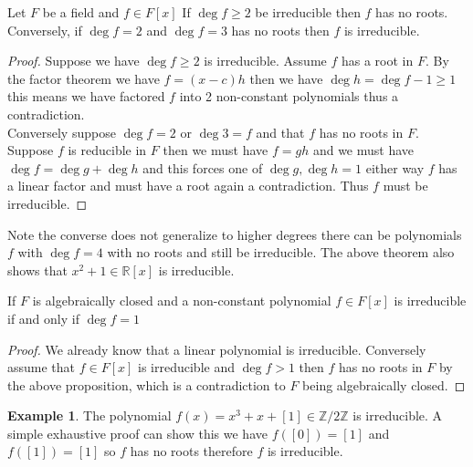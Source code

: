 \documentclass[16pt,a4paper]{article}
\theoremstyle{definition}
\newtheorem{example}{Example}
\newcommand{\Z}{\mathbb{Z}}
\newcommand{\R}{\mathbb{R}}
\begin{document}
\begin{prop}{}{}
  Let $F$ be a field and $f\in F[x]$ If $\deg f \geq 2$ be irreducible then $f$ has no roots. Conversely, if $\deg f = 2$ and $\deg f = 3$ has no roots then $f$ is irreducible. 
  \end{prop}  
\begin{proof}
Suppose we have $\deg f\geq 2$ is irreducible. Assume $f$ has a root in $F$. By the factor theorem we have $f = (x-c)h$ then we have $\deg	h = \deg f -1 \geq 1$ this means we have factored $f$ into 2 non-constant polynomials thus a contradiction. 
\\
Conversely suppose $\deg f = 2$ or $\deg 3 = f$ and that $f$ has no roots in $F$. Suppose $f$ is reducible in $F$ then we must have $f = gh$ and we must have $\deg f = \deg g + \deg h$ and this forces one of $\deg g, \deg h = 1$ either way $f$ has a linear factor and must have a root again a contradiction. Thus $f$ must be irreducible.  
\end{proof}
Note the converse does not generalize to higher degrees there can be polynomials $f$ with $\deg f = 4$ with no roots and still be irreducible. The above theorem also shows that $x^2 + 1 \in \R[x]$ is irreducible. 

\begin{coll}{}{}
If $F$ is algebraically closed and a non-constant polynomial $f\in F[x]$ is irreducible if and only if $\deg f = 1$
\end{coll}
\begin{proof}
We already know that a linear polynomial is irreducible. Conversely assume that $f\in F[x]$ is irreducible and $\deg f > 1$ then $f$ has no roots in $F$ by the above proposition, which is a contradiction to $F$ being algebraically closed. 
\end{proof}

\begin{example}
The polynomial $f(x) = x^3 +x+[1]\in \Z/2\Z$ is irreducible. A simple exhaustive proof can show this we have $f([0]) = [1]$ and $f([1]) = [1]$ so $f$ has no roots therefore $f$ is irreducible. 
\end{example}
\newpage
\end{document}
